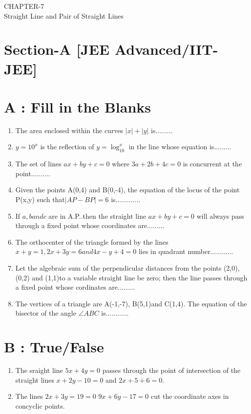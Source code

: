\documentclass[12pt]{article}
\begin{document}
\begin{center}
\textbf\large{CHAPTER-7 \\ Straight Line and Pair of Straight Lines}

\end{center}

\section*{Section-A    [JEE Advanced/IIT-JEE]}
\section*{A    :  Fill in the Blanks}
\begin{enumerate}

\item  The area enclosed within the curves $|x|+|y|$ is.........\\
\item  $y=10^x$ is the reflection of $y=\log_10^x $ in the line whose equation is.........\\
\item The set of lines $ax+by+c=0$ where $3a+2b+4c=0$ is concurrent at the point..........\\
\item  Given the points A(0,4) and B(0,-4), the equation of the locus of the point P(x,y) such that$|AP-BP|=6$ is.............\\
\item  If $a,b and c$ are in A.P..then the straight line $ax+by+c=0$ will always pass through a fixed point whose coordinates are.........\\
\item  The orthocenter of the triangle formed by the lines $x+y=1, 2x+3y=6  and  4x-y+4=0$ lies in quadrant number............\\
\item Let the algebraic sum of the perpendicular distances from the points (2,0), (0,2) and (1,1)to a variable straight line be zero; then the line passes through a fixed point whose cordinates are.........\\
\item The vertices of a triangle are  A(-1,-7), B(5,1)and C(1,4). The equation of the bisector of the angle $\angle{ABC}$ is............\\

\end{enumerate}

\section*{B    :    True/False}
\begin{enumerate}

\item  The sraight line $5x+4y=0$ passes through the point of intersection of the straight lines $x+2y-10=0$ and $2x+5+6=0$.\\
\item The lines $2x+3y=19=0$ $9x+6y-17=0$ cut the coordinate axes in concyclic points.\\
\end{enumerate}
\end{document}

